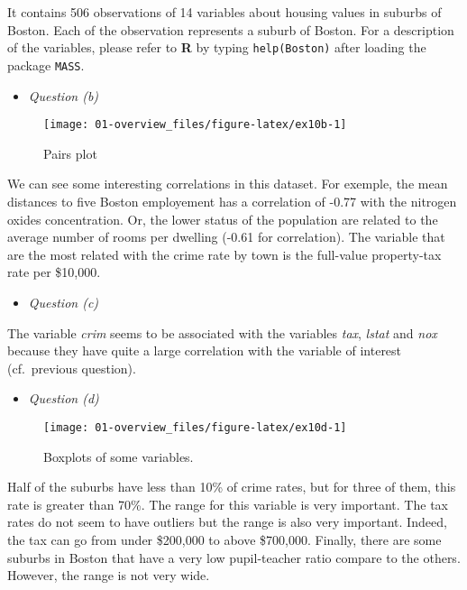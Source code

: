 \documentclass[]{book}
\providecommand{\tightlist}{%
  \setlength{\itemsep}{0pt}\setlength{\parskip}{0pt}}
\begin{document}
It contains 506 observations of 14 variables about housing values in suburbs of Boston. Each of the observation represents a suburb of Boston. For a description of the variables, please refer to \textbf{R} by typing \texttt{help(Boston)} after loading the package \texttt{MASS}.

\begin{itemize}
\tightlist
\item
  \emph{Question (b)}
\end{itemize}

\begin{figure}

{\centering \texttt{[image: 01-overview\_files/figure-latex/ex10b-1]} 

}

\caption{Pairs plot}\label{fig:ex10b}
\end{figure}

We can see some interesting correlations in this dataset. For exemple, the mean distances to five Boston employement has a correlation of -0.77 with the nitrogen oxides concentration. Or, the lower status of the population are related to the average number of rooms per dwelling (-0.61 for correlation). The variable that are the most related with the crime rate by town is the full-value property-tax rate per \$10,000.

\begin{itemize}
\tightlist
\item
  \emph{Question (c)}
\end{itemize}

The variable \emph{crim} seems to be associated with the variables \emph{tax}, \emph{lstat} and \emph{nox} because they have quite a large correlation with the variable of interest (cf.~previous question).

\begin{itemize}
\tightlist
\item
  \emph{Question (d)}
\end{itemize}

\begin{figure}

{\centering \texttt{[image: 01-overview\_files/figure-latex/ex10d-1]} 

}

\caption{Boxplots of some variables.}\label{fig:ex10d}
\end{figure}

Half of the suburbs have less than 10\% of crime rates, but for three of them, this rate is greater than 70\%. The range for this variable is very important. The tax rates do not seem to have outliers but the range is also very important. Indeed, the tax can go from under \$200,000 to above \$700,000. Finally, there are some suburbs in Boston that have a very low pupil-teacher ratio compare to the others. However, the range is not very wide.
\end{document}
